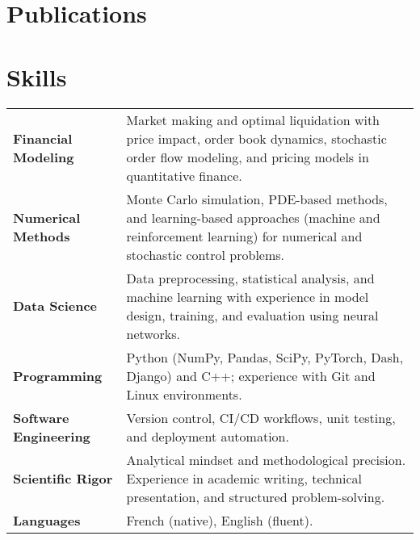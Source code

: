 \documentclass[a4paper,12pt]{article}
\begin{document}
	\section{Publications}
	\begin{refsection}
	\nocite{*}
	\printbibliography[heading=none]
	\end{refsection}

	\section{Skills}
	\begin{tabularx}{\linewidth}{@{}l X@{}}
		\textbf{Financial Modeling} & Market making and optimal liquidation with price impact, order book dynamics, stochastic order flow modeling, and pricing models in quantitative finance. \\
		\textbf{Numerical Methods} & Monte Carlo simulation, PDE-based methods, and learning-based approaches (machine and reinforcement learning) for numerical and stochastic control problems. \\
		\textbf{Data Science} & Data preprocessing, statistical analysis, and machine learning with experience in model design, training, and evaluation using neural networks. \\
		\textbf{Programming} & Python (NumPy, Pandas, SciPy, PyTorch, Dash, Django) and C++; experience with Git and Linux environments. \\
		\textbf{Software Engineering} & Version control, CI/CD workflows, unit testing, and deployment automation. \\
		\textbf{Scientific Rigor} & Analytical mindset and methodological precision. Experience in academic writing, technical presentation, and structured problem-solving. \\
		\textbf{Languages} & French (native), English (fluent).
	\end{tabularx}
\end{document}
